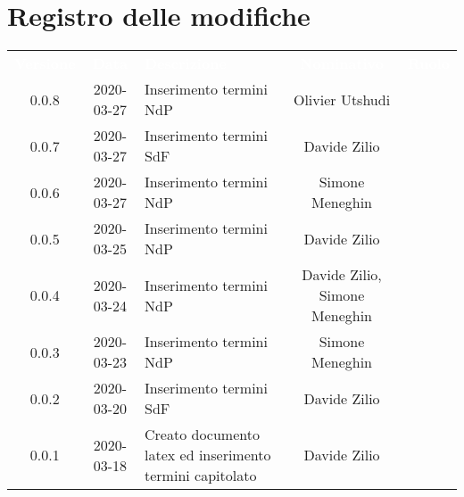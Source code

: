 \section*{Registro delle modifiche}
{
	\centering
	\begin{longtable}{ c c  C{4cm}  c  c }
		\textcolor{white}{\textbf{Versione}} & \textcolor{white}{\textbf{Data}} & \textcolor{white}{\textbf{Descrizione}} & \textcolor{white}{\textbf{Nominativo}} & \textcolor{white}{\textbf{Ruolo}}\\
		0.0.8 & 2020-03-27 & Inserimento termini NdP & Olivier Utshudi &\reda{}\\
		0.0.7 & 2020-03-27 & Inserimento termini SdF & Davide Zilio &\reda{}\\
		0.0.6 & 2020-03-27 & Inserimento termini NdP & Simone Meneghin &\reda{}\\
		0.0.5 & 2020-03-25 & Inserimento termini NdP & Davide Zilio &\reda{}\\
		0.0.4 & 2020-03-24 & Inserimento termini NdP & Davide Zilio, Simone Meneghin &\reda{}\\
		
		0.0.3 & 2020-03-23 & Inserimento termini NdP & Simone Meneghin & \reda{}\\
		
		0.0.2 & 2020-03-20 & Inserimento termini SdF& Davide Zilio &\reda{}\\
		
		0.0.1 & 2020-03-18 & Creato documento latex ed inserimento termini capitolato & Davide Zilio &\reda{}\\		
		
	\end{longtable}

}